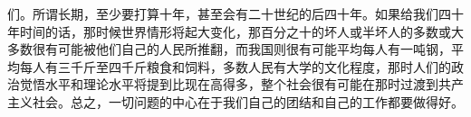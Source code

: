 们。所谓长期，至少要打算十年，甚至会有二十世纪的后四十年。如果给我们四十年时间的话，那时候世界情形将起大变化，那百分之十的坏人或半坏人的多数或大多数很有可能被他们自己的人民所推翻，而我国则很有可能平均每人有一吨钢，平均每人有三千斤至四千斤粮食和饲料，多数人民有大学的文化程度，那时人们的政治觉悟水平和理论水平将提到比现在高得多，整个社会很有可能在那时过渡到共产主义社会。总之，一切问题的中心在于我们自己的团结和自己的工作都要做得好。


